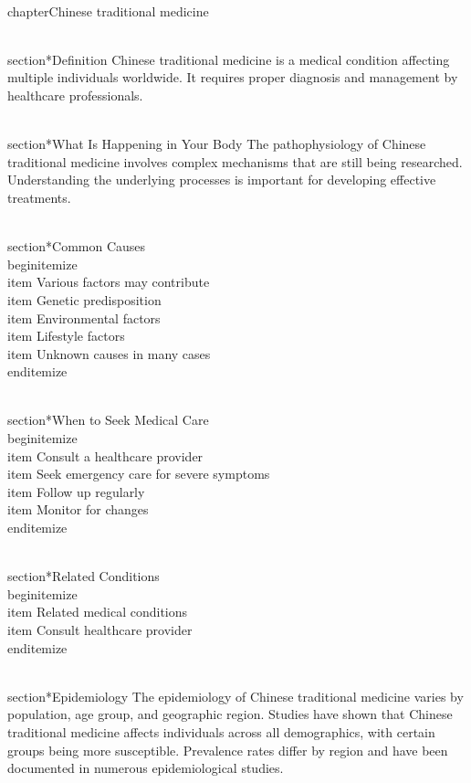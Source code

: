 
\\chapter{Chinese traditional medicine}

\\section*{Definition}
Chinese traditional medicine is a medical condition affecting multiple individuals worldwide. It requires proper diagnosis and management by healthcare professionals.

\\section*{What Is Happening in Your Body}
The pathophysiology of Chinese traditional medicine involves complex mechanisms that are still being researched. Understanding the underlying processes is important for developing effective treatments.

\\section*{Common Causes}
\\begin{itemize}
\\item Various factors may contribute\n  \\item Genetic predisposition\n  \\item Environmental factors\n  \\item Lifestyle factors\n  \\item Unknown causes in many cases
\\end{itemize}

\\section*{When to Seek Medical Care}
\\begin{itemize}
\\item Consult a healthcare provider\n  \\item Seek emergency care for severe symptoms\n  \\item Follow up regularly\n  \\item Monitor for changes
\\end{itemize}

\\section*{Related Conditions}
\\begin{itemize}
\\item Related medical conditions\n  \\item Consult healthcare provider
\\end{itemize}

\\section*{Epidemiology}
The epidemiology of Chinese traditional medicine varies by population, age group, and geographic region. Studies have shown that Chinese traditional medicine affects individuals across all demographics, with certain groups being more susceptible. Prevalence rates differ by region and have been documented in numerous epidemiological studies.

